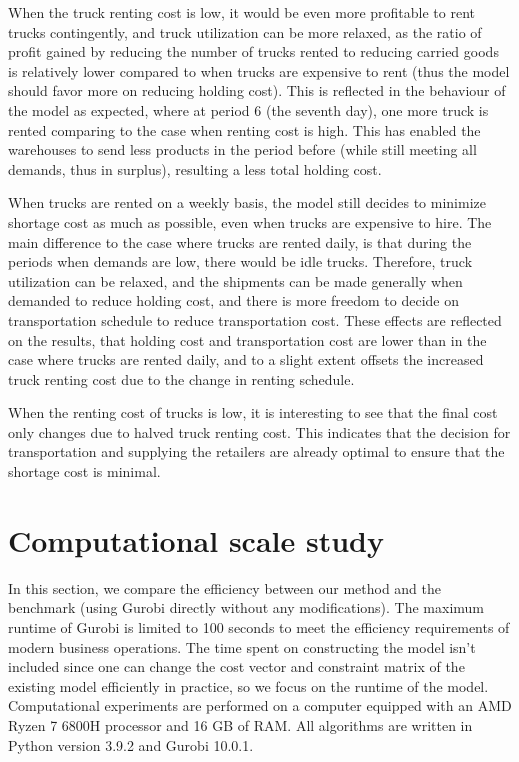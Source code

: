 \documentclass[a4paper,12pt]{article}
\begin{document}
When the truck renting cost is low, it would be even more profitable to rent trucks contingently, and truck utilization can be more relaxed, as the ratio of profit gained by reducing the number of trucks rented to reducing carried goods is relatively lower compared to when trucks are expensive to rent (thus the model should favor more on reducing holding cost). This is reflected in the behaviour of the model as expected, where at period 6 (the seventh day), one more truck is rented comparing to the case when renting cost is high. This has enabled the warehouses to send less products in the period before (while still meeting all demands, thus in surplus), resulting a less total holding cost.

When trucks are rented on a weekly basis, the model still decides to minimize shortage cost as much as possible, even when trucks are expensive to hire. The main difference to the case where trucks are rented daily, is that during the periods when demands are low, there would be idle trucks. Therefore, truck utilization can be relaxed, and the shipments can be made generally when demanded to reduce holding cost, and there is more freedom to decide on transportation schedule to reduce transportation cost. These effects are reflected on the results, that holding cost and transportation cost are lower than in the case where trucks are rented daily, and to a slight extent offsets the increased truck renting cost due to the change in renting schedule.

When the renting cost of trucks is low, it is interesting to see that the final cost only changes due to halved truck renting cost. This indicates that the decision for transportation and supplying the retailers are already optimal to ensure that the shortage cost is minimal.








\section{Computational scale study}\label{sec:computational-scale-study}

In this section, we compare the efficiency between our method and the benchmark (using Gurobi directly without any modifications).
The maximum runtime of Gurobi is limited to 100 seconds to meet the efficiency requirements of modern business operations.
The time spent on constructing the model isn't included since one can change the cost vector and constraint matrix of the existing model efficiently in practice, so we focus on the runtime of the model.
Computational experiments are performed on a computer equipped with an AMD Ryzen 7 6800H processor and 16 GB of RAM.
All algorithms are written in Python version 3.9.2 and Gurobi 10.0.1.
\end{document}
